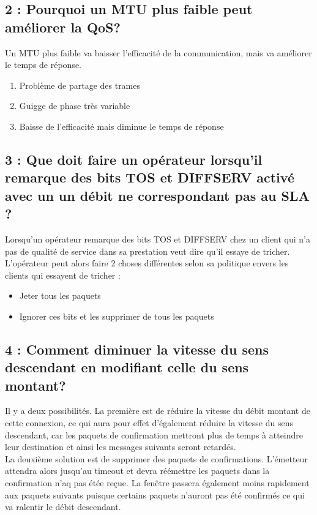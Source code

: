 \documentclass{article}
\begin{document}
\subsection*{2 : Pourquoi un MTU plus faible peut améliorer la QoS?}

Un MTU plus faible va baisser l'efficacité de la communication, mais va améliorer le temps de réponse.
\begin{enumerate}
\item Problème de partage des trames
\item Guigge de phase très variable
\item Baisse de l'efficacité mais diminue le temps de réponse
\end{enumerate}

\subsection*{3 : Que doit faire un opérateur lorsqu'il remarque des bits TOS et DIFFSERV activé avec un un débit ne correspondant pas au SLA ?}

Lorsqu'un opérateur remarque des bits TOS \cite{ToS} et DIFFSERV \cite{DiffServ} chez un client qui n'a pas de qualité de service dans sa prestation veut dire qu'il essaye de tricher.\\

L'opérateur peut alors faire 2 choses différentes selon sa politique envers les clients qui essayent de tricher : 

\begin{itemize}
 	\item Jeter tous les paquets
 	\item Ignorer ces bits et les supprimer de tous les paquets
\end{itemize}

\subsection*{4 : Comment diminuer la vitesse du sens descendant en modifiant celle du sens montant?}

Il y a deux possibilités. La première est de réduire la vitesse du débit montant de cette connexion, ce qui aura pour effet d'également réduire la vitesse du sens descendant, car les paquets de confirmation mettront plus de temps à atteindre leur destination et ainsi les messages suivants seront retardés.\\

La deuxième solution est de supprimer des paquets de confirmations. L'émetteur attendra alors jusqu'au timeout et devra réémettre les paquets dans la confirmation n'aq pas étée reçue. La fenêtre passera également moins rapidement aux paquets suivants puisque certains paquets n'auront pas été confirmés ce qui va ralentir le débit descendant.
\end{document}
